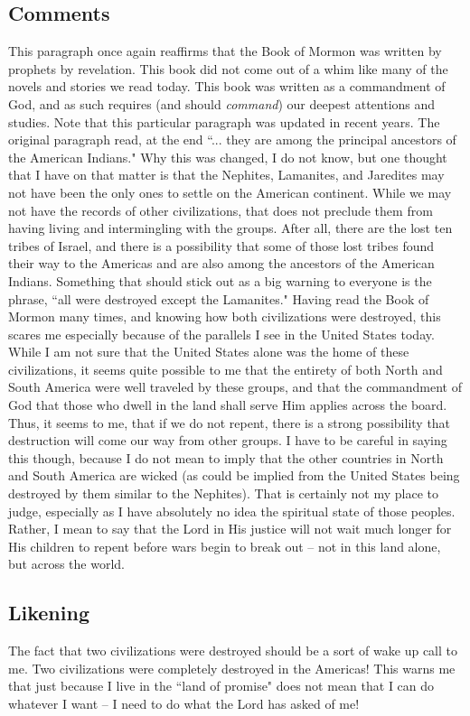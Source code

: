 \documentclass[12pt]{report}
\begin{document}
\subsection{Comments\label{intro:comments2}}
This paragraph once again reaffirms that the Book of Mormon was written by prophets by revelation.  This book did not come out of a whim like many  of the novels and stories we read today.  This book was written as a commandment of God, and as such requires (and should \emph{command}) our deepest attentions and studies.  Note that this particular paragraph was updated in recent years.  The original paragraph read, at the end ``... they are among the principal ancestors of the American Indians."  Why this was changed, I do not know, but one thought that I have on that matter is that the Nephites, Lamanites, and Jaredites may not have been the only ones to settle on the American continent. While we may not have the records of other civilizations, that does not preclude them from having living and intermingling with the groups.  After all, there are the lost ten tribes of Israel, and there is a possibility that some of those lost tribes found their way to the Americas and are also among the ancestors of the American Indians.  Something that should stick out as a big warning to everyone is the phrase, ``all were destroyed except the Lamanites."  Having read the Book of Mormon many times, and knowing how both civilizations were destroyed, this scares me especially because of the parallels I see in the United States today.  While I am not sure that the United States alone was the home of these civilizations, it seems quite possible to me that the entirety of both North and South America were well traveled by these groups, and that the commandment of God that those who dwell in the land shall serve Him applies across the board.  Thus, it seems to me, that if we do not repent, there is a strong possibility that destruction will come our way from other groups.  I have to be careful in saying this though, because I do not mean to imply that the other countries in North and South America are wicked (as could be implied from the United States being destroyed by them similar to the Nephites).  That is certainly not my place to judge, especially as I have absolutely no idea the spiritual state of those peoples.  Rather, I mean to say that the Lord in His justice will not wait much longer for His children to repent before wars begin to break out -- not in this land alone, but across the world.

\subsection{Likening\label{intro:likening2}}
The fact that two civilizations were destroyed should be a sort of wake up call to me.  Two civilizations were completely destroyed in the Americas!  This warns me that just because I live in the ``land of promise" does not mean that I can do whatever I want -- I need to do what the Lord has asked of me!
\end{document}
